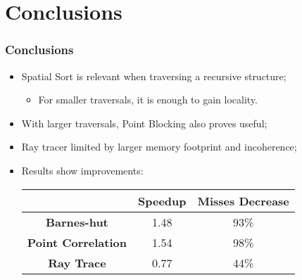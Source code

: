 \section{Conclusions}
\begin{frame}
	\frametitle{Conclusions}
	\begin{itemize}\itemsep=15pt
		\item Spatial Sort is relevant when traversing a recursive structure;
		\begin{itemize}
			\item For smaller traversals, it is enough to gain locality.
		\end{itemize}

		\item With larger traversals, Point Blocking also proves useful;

		\item Ray tracer limited by larger memory footprint and incoherence;

		\item Results show improvements:
		\begin{table}
			\begin{tabular}{|c|cc|}
				\hline
				& \textbf{Speedup} & \textbf{Misses Decrease}	\\
				\hline
				\textbf{Barnes-hut} &  1.48 & 93\%	\\
				\textbf{Point Correlation} & 1.54 & 98\%	\\
				\textbf{Ray Trace} & 0.77 & 44\%	\\
				\hline
			\end{tabular}
		\end{table}
	\end{itemize}
\end{frame}